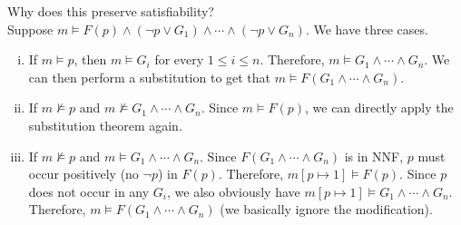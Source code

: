 Why does this preserve satisfiability?\\
Suppose $m\vDash F(p)\land(\neg p\lor G_1)\land\cdots\land(\neg p\lor G_n)$. We have three cases.
\begin{enumerate}[(i)]
	\item If $m\vDash p$, then $m\vDash G_i$ for every $1\leq i\leq n$. Therefore, $m\vDash G_1\land\cdots\land G_n$. We can then perform a substitution to get that $m\vDash F(G_1\land\cdots\land G_n)$.
	\item If $m\nvDash p$ and $m\nvDash G_1\land\cdots\land G_n$. Since $m\vDash F(p)$, we can directly apply the substitution theorem again.
	\item If $m\nvDash p$ and $m\vDash G_1\land\cdots\land G_n$. Since $F(G_1\land\cdots\land G_n)$ is in NNF, $p$ must occur positively (no $\neg p$) in $F(p)$. Therefore, $m[p\mapsto 1]\vDash F(p)$. Since $p$ does not occur in any $G_i$, we also obviously have $m[p\mapsto 1]\vDash G_1\land\cdots\land G_n$. Therefore, $m\vDash F(G_1\land\cdots\land G_n)$ (we basically ignore the modification).
\end{enumerate}